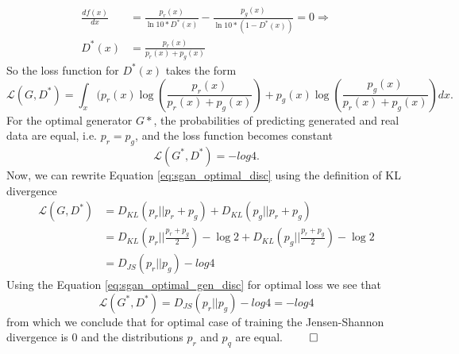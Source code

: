 \begin{equation*}
\begin{split}
  \frac{df(x)}{dx} & = \frac{p_r(x)}{\ln{10} * D^*(x)} - \frac{p_g(x)}{\ln{10} * (1-D^*(x))} = 0 \Rightarrow \\
  D^*(x) & = \frac{p_r(x)}{p_r(x) + p_g(x)}
\end{split}
\end{equation*}
So the loss function for $D^*(x)$ takes the form
\begin{equation}
  \mathcal{L}(G, D^*) = \int_x(p_r(x)\log{(\frac{p_r(x)}{p_r(x) + p_g(x)})} + p_g(x)\log{(\frac{p_g(x)}{p_r(x) + p_g(x)})}dx.
  \label{eq:sgan_optimal_disc}
\end{equation}
For the optimal generator $G*$, the probabilities of predicting generated and
real data are equal, i.e. $p_r=p_g$, and the loss function becomes constant
\begin{equation}
\mathcal{L}(G^*, D^*) = -log{4}.
\label{eq:sgan_optimal_gen_disc}
\end{equation}
Now, we can rewrite Equation \ref{eq:sgan_optimal_disc} using the definition of KL
divergence
\begin{equation*}
  \begin{split}
    \mathcal{L}(G, D^*) & = D_{KL}(p_r || p_r + p_g) + D_{KL}(p_g || p_r + p_g) \\ 
    & = D_{KL}(p_r || \frac{p_r + p_g}{2}) - \log{2} + D_{KL}(p_g || \frac{p_r + p_g}{2}) -\log{2} \\
    & = D_{JS}(p_r || p_g) - log{4}
  \end{split}
\end{equation*}
Using the Equation \ref{eq:sgan_optimal_gen_disc} for optimal loss we see that
\begin{equation*}
  \mathcal{L}(G^*, D^*) = D_{JS}(p_r || p_g) -log{4} =  - log{4}
\end{equation*}
from which we conclude that for optimal case of training the Jensen-Shannon
divergence is $0$ and the distributions $p_r$ and $p_q$ are equal. $\qed$



\let\oldclearpage\clearpage
\let\clearpage\relax
